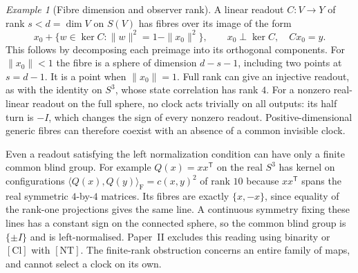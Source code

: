 \documentclass[11pt,reqno]{amsart}
\theoremstyle{definition}
\theoremstyle{remark}
\newtheorem{example}[theorem]{Example}
\numberwithin{equation}{section}
\begin{document}
\begin{example}[Fibre dimension and observer rank]\label{d4:blind}
A linear readout \(C:V\to Y\) of rank \(s<d=\dim V\) on \(S(V)\)
has fibres over its image of the form
\[
 x_0+\{w\in\ker C:\|w\|^2=1-\|x_0\|^2\},
 \qquad x_0\perp\ker C,\quad Cx_0=y.
\]
This follows by decomposing each preimage into its orthogonal
components. For \(\|x_0\|<1\) the fibre is a sphere of dimension
\(d-s-1\), including two points at \(s=d-1\). It is a point when
\(\|x_0\|=1\). Full rank can give an injective readout, as with the
identity on \(S^3\), whose state correlation has rank \(4\).
For a nonzero real-linear readout on the full sphere, no clock acts
trivially on all outputs: its half turn is \(-I\), which changes the
sign of every nonzero readout. Positive-dimensional generic fibres
can therefore coexist with an absence of a common invisible clock.

Even a readout satisfying the left normalization condition can have
only a finite common blind group. For example
\(Q(x)=xx^{\mathsf T}\) on the real \(S^3\) has kernel on configurations
\(\langle Q(x),Q(y)\rangle_{\mathrm F}=c(x,y)^2\) of rank \(10\)
because \(xx^{\mathsf T}\) spans the real symmetric \(4\)-by-\(4\)
matrices. Its fibres are exactly \(\{x,-x\}\), since equality of the
rank-one projections gives the same line. A continuous symmetry
fixing these lines has a constant sign on the connected sphere,
so the common blind group is \(\{\pm I\}\) and is left-normalised.
Paper~II excludes this reading using binarity or
\([\mathrm{Cl}]\) with \([\mathrm{NT}]\). The finite-rank obstruction
concerns an entire family of maps, and cannot select a clock on its own.
\end{example}
\end{document}
